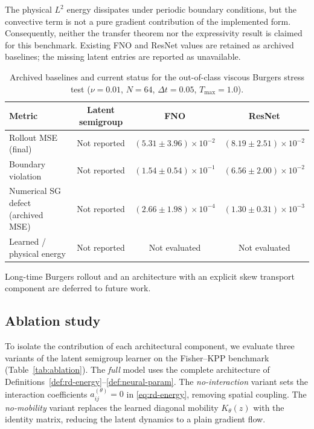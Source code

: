 \documentclass[hidelinks,review,nohypdvips,onefignum,onetabnum]{siamart220329}
\begin{document}
The physical $L^2$ energy dissipates under periodic boundary conditions, but the convective term is not a pure gradient contribution of the implemented form. Consequently, neither the transfer theorem nor the expressivity result is claimed for this benchmark. Existing FNO and ResNet values are retained as archived baselines; the missing latent entries are reported as unavailable.

\begin{table}[htbp]
\centering
\caption{Archived baselines and current status for the out-of-class viscous Burgers stress test ($\nu=0.01$, $N=64$, $\Delta t=0.05$, $T_{\max}=1.0$).}
\label{tab:burgers-results}
\small
\begin{tabular}{@{}lccc@{}}
\hline
Metric & Latent semigroup & FNO & ResNet \\
\hline
Rollout MSE (final) & Not reported & $(5.31\pm 3.96)\times10^{-2}$ & $(8.19\pm 2.51)\times10^{-2}$ \\[2pt]
Boundary violation & Not reported & $(1.54\pm 0.54)\times10^{-1}$ & $(6.56\pm 2.00)\times10^{-2}$ \\[2pt]
Numerical SG defect (archived MSE) & Not reported & $(2.66\pm 1.98)\times10^{-4}$ & $(1.30\pm 0.31)\times10^{-3}$ \\[2pt]
Learned / physical energy & Not reported & Not evaluated & Not evaluated \\
\hline
\end{tabular}
\end{table}

Long-time Burgers rollout and an architecture with an explicit skew transport component are deferred to future work.

\subsection{Ablation study}\label{subsec:ablation}
To isolate the contribution of each architectural component, we evaluate three variants of the latent semigroup learner on the Fisher--KPP benchmark (Table~\ref{tab:ablation}). The \emph{full} model uses the complete architecture of Definitions~\ref{def:rd-energy}--\ref{def:neural-param}. The \emph{no-interaction} variant sets the interaction coefficients $a_{ij}^{(\theta)}=0$ in \eqref{eq:rd-energy}, removing spatial coupling. The \emph{no-mobility} variant replaces the learned diagonal mobility $K_{\theta}(z)$ with the identity matrix, reducing the latent dynamics to a plain gradient flow.
\end{document}
